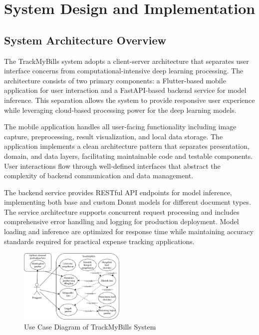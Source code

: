 \section{System Design and Implementation}

\subsection{System Architecture Overview}
The TrackMyBills system adopts a client-server architecture that separates user interface concerns from computational-intensive deep learning processing. The architecture consists of two primary components: a Flutter-based mobile application for user interaction and a FastAPI-based backend service for model inference. This separation allows the system to provide responsive user experience while leveraging cloud-based processing power for the deep learning models.

The mobile application handles all user-facing functionality including image capture, preprocessing, result visualization, and local data storage. The application implements a clean architecture pattern that separates presentation, domain, and data layers, facilitating maintainable code and testable components. User interactions flow through well-defined interfaces that abstract the complexity of backend communication and data management.

The backend service provides RESTful API endpoints for model inference, implementing both base and custom Donut models for different document types. The service architecture supports concurrent request processing and includes comprehensive error handling and logging for production deployment. Model loading and inference are optimized for response time while maintaining accuracy standards required for practical expense tracking applications.

\begin{figure}[htbp]
    \centerline{\includegraphics[width=0.45\textwidth]{images/use-case-diagram.png}}
    \caption{Use Case Diagram of TrackMyBills System}
    \label{fig:usecase}
\end{figure}

